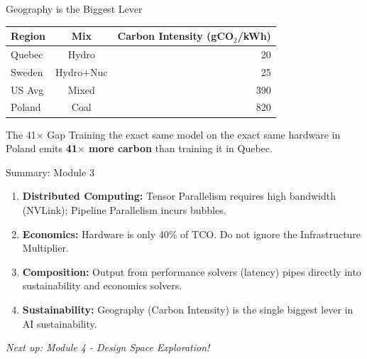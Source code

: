 \documentclass[aspectratio=169, 12pt]{beamer}
\begin{document}
\begin{frame}{Geography is the Biggest Lever}
\centering
\begin{tabular}{lcr}
\toprule
\textbf{Region} & \textbf{Mix} & \textbf{Carbon Intensity (gCO$_2$/kWh)} \\
\midrule
Quebec    & Hydro       & 20 \\
Sweden    & Hydro+Nuc   & 25 \\
US Avg    & Mixed       & 390 \\
Poland    & Coal        & 820 \\
\bottomrule
\end{tabular}
\vfill
\begin{alertblock}{The 41$\times$ Gap}
Training the exact same model on the exact same hardware in Poland emits \textbf{41$\times$ more carbon} than training it in Quebec.
\end{alertblock}
\end{frame}

\begin{frame}{Summary: Module 3}
\begin{enumerate}
  \item \textbf{Distributed Computing:} Tensor Parallelism requires high bandwidth (NVLink); Pipeline Parallelism incurs bubbles.
  \item \textbf{Economics:} Hardware is only 40\% of TCO. Do not ignore the Infrastructure Multiplier.
  \item \textbf{Composition:} Output from performance solvers (latency) pipes directly into sustainability and economics solvers.
  \item \textbf{Sustainability:} Geography (Carbon Intensity) is the single biggest lever in AI sustainability.
\end{enumerate}
\vspace{1em}
\begin{center}
\textit{Next up: Module 4 - Design Space Exploration!}
\end{center}
\end{frame}
\end{document}
